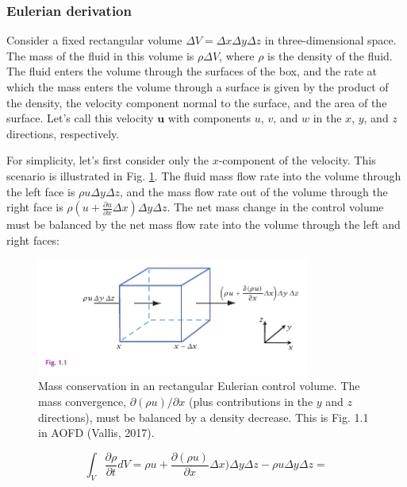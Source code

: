 \documentclass[12pt]{article}
\numberwithin{equation}{section}
\numberwithin{figure}{section}
\numberwithin{table}{section}
\begin{document}
\subsubsection{Eulerian derivation}

Consider a fixed rectangular volume $\Delta V = \Delta x \Delta y \Delta z$ in
three-dimensional space.
The mass of the fluid in this volume is $\rho \Delta V$, where $\rho$ is the
density of the fluid.
The fluid enters the volume through the surfaces of the box, and the rate at
which the mass enters the volume through a surface is given by the product of
the density, the velocity component normal to the surface, and the area of the
surface.
Let's call this velocity $\mathbf{u}$ with components $u$, $v$, and $w$ in the
$x$, $y$, and $z$ directions, respectively.

For simplicity, let's first consider only the $x$-component of the velocity.
This scenario is illustrated in Fig. \ref{fig:continuity1}.
The fluid mass flow rate into the volume through the left face is $\rho u \Delta y \Delta z$,
and the mass flow rate out of the volume through the right face is
$\rho (u + \frac{\partial u}{\partial x} \Delta x) \Delta y \Delta z$.
The net mass change in the control volume must be balanced by the net mass flow
rate into the volume through the left and right faces:

\begin{figure}[h]
  \centering
  \includegraphics[width=0.8\textwidth]{assets/fig_continuity1.pdf}
  \caption{
    Mass conservation in an rectangular Eulerian control volume.
    The mass convergence, $\partial(\rho u)/\partial x$
    (plus contributions in the $y$ and $z$ directions),
    must be balanced by a density decrease.
    This is Fig. 1.1 in AOFD (Vallis, 2017).
  }
  \label{fig:continuity1}
\end{figure}

\begin{equation}
  \int_V \frac{\partial \rho}{\partial t} dV =
  \rho u + \frac{\partial (\rho u)}{\partial x} \Delta x) \Delta y \Delta z - \rho u \Delta y \Delta z =
\end{equation}
\end{document}
